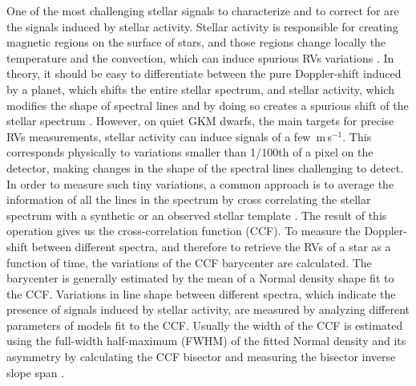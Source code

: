 \documentclass{aa}
\def\ms{\hbox{\,m\,s$^{-1}$}}         %
\begin{document}
One of the most challenging stellar signals to characterize and to correct for are the signals induced by stellar activity. 
Stellar activity is responsible for creating magnetic regions on the surface of stars, and those regions change locally the temperature and the convection, which can induce spurious RVs variations \citep[e.g.][]{Meunier-2010a, Dumusque-2014b, Borgniet-2015}. 
In theory, it should be easy to differentiate between the pure Doppler-shift induced by a planet, which shifts the entire stellar spectrum, and stellar activity, which modifies the shape of spectral lines and by doing so creates a spurious shift of the stellar spectrum \citep{Saar-1997b,Hatzes-2002,Kurster2003,Lindegren-2003,Desort-2007,Lagrange-2010,Meunier-2010a,Dumusque-2014b}. 
However, on quiet GKM dwarfs, the main targets for precise RVs measurements, stellar activity can induce signals of a few \ms. 
This corresponds physically to variations smaller than 1/100th of a pixel on the detector, making changes in the shape of the spectral lines challenging to detect.
In order to measure such tiny variations, a common approach is to average the information of all the lines in the spectrum by cross correlating the stellar spectrum with a synthetic or an observed stellar template \citep[][]{Baranne-1996,Pepe-2002a, Anglada-Escude-2012}. The result of this operation gives us the cross-correlation function (CCF).  
%
To measure the Doppler-shift between different spectra, and therefore to retrieve the RVs of a star as a function of time, the variations of the CCF barycenter are calculated. 
The barycenter is generally estimated by the mean of  a Normal density shape fit to the CCF. 
Variations in line shape between different spectra, which indicate the presence of signals induced by stellar activity, are measured by analyzing different parameters of models fit to the CCF. Usually the width of the CCF is estimated using the full-width half-maximum (FWHM) of the fitted Normal density and its asymmetry by calculating the CCF bisector and measuring the bisector inverse slope span \citep[BIS SPAN,][]{Queloz-2001}.

\end{document}

